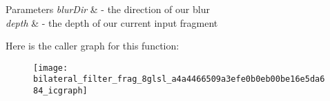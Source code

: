\begin{DoxyParams}{Parameters}
{\em blur\-Dir} & -\/ the direction of our blur \\
\hline
{\em depth} & -\/ the depth of our current input fragment \\
\hline
\end{DoxyParams}


Here is the caller graph for this function\-:\nopagebreak
\begin{figure}[H]
\begin{center}
\leavevmode
\texttt{[image: bilateral\_filter\_frag\_8glsl\_a4a4466509a3efe0b0eb00be16e5da684\_icgraph]}
\end{center}
\end{figure}


